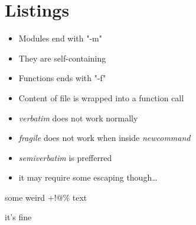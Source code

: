 \section{Listings}


{
\begin{itemize}
\item Modules end with "-m"
\item They are self-containing
\end{itemize}

}


{
\begin{itemize}
\item Functions ends with "-f"
\item Content of file is wrapped into a function call
\end{itemize}

}


{
\tiny{}
\begin{multicols}{2}

\end{multicols}
}


{
\begin{itemize}
\item \emph{verbatim} does not work normally
\item \emph{fragile} does not work when inside \emph{newcommand}
\item \emph{semiverbatim} is prefferred
\item it may require some escaping though\ldots
\end{itemize}
\begin{semiverbatim}
some weird +!@\% text

it's fine \
\end{semiverbatim}
}

